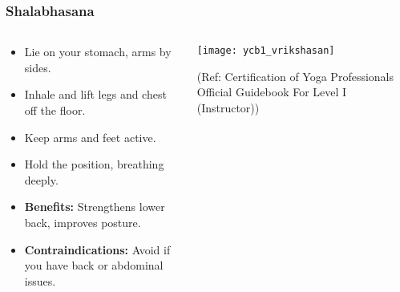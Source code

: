 \begin{frame}[fragile]\frametitle{Shalabhasana}
\begin{columns}
    \begin{column}[T]{0.5\linewidth}
      \begin{itemize}
        \item Lie on your stomach, arms by sides.
        \item Inhale and lift legs and chest off the floor.
        \item Keep arms and feet active.
        \item Hold the position, breathing deeply.
        \item \textbf{Benefits:} Strengthens lower back, improves posture.
        \item \textbf{Contraindications:} Avoid if you have back or abdominal issues.
      \end{itemize}
    \end{column}
    \begin{column}[T]{0.5\linewidth}
        \begin{center}
        \begin{center}
		        \texttt{[image: ycb1\_vrikshasan]}
				
				{\tiny (Ref: Certification  of Yoga Professionals Official Guidebook For Level I (Instructor))}	        
		\end{center}   
        \end{center}    
    \end{column}
  \end{columns}
\end{frame}

